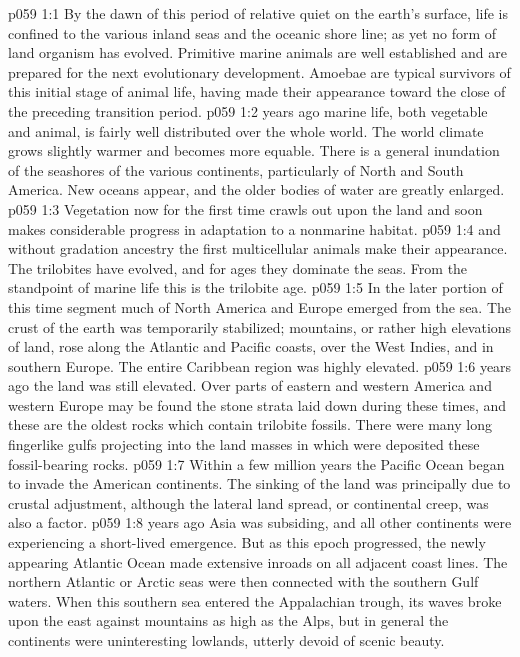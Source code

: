 \vs p059 1:1 By the dawn of this period of relative quiet on the earth’s surface, life is confined to the various inland seas and the oceanic shore line; as yet no form of land organism has evolved. Primitive marine animals are well established and are prepared for the next evolutionary development. Amoebae are typical survivors of this initial stage of animal life, having made their appearance toward the close of the preceding transition period.
\vs p059 1:2 \pc {} years ago marine life, both vegetable and animal, is fairly well distributed over the whole world. The world climate grows slightly warmer and becomes more equable. There is a general inundation of the seashores of the various continents, particularly of North and South America. New oceans appear, and the older bodies of water are greatly enlarged.
\vs p059 1:3 Vegetation now for the first time crawls out upon the land and soon makes considerable progress in adaptation to a nonmarine habitat.
\vs p059 1:4  and without gradation ancestry the first multicellular animals make their appearance. The trilobites have evolved, and for ages they dominate the seas. From the standpoint of marine life this is the trilobite age.
\vs p059 1:5 In the later portion of this time segment much of North America and Europe emerged from the sea. The crust of the earth was temporarily stabilized; mountains, or rather high elevations of land, rose along the Atlantic and Pacific coasts, over the West Indies, and in southern Europe. The entire Caribbean region was highly elevated.
\vs p059 1:6 \pc {} years ago the land was still elevated. Over parts of eastern and western America and western Europe may be found the stone strata laid down during these times, and these are the oldest rocks which contain trilobite fossils. There were many long fingerlike gulfs projecting into the land masses in which were deposited these fossil\hyp{}bearing rocks.
\vs p059 1:7 Within a few million years the Pacific Ocean began to invade the American continents. The sinking of the land was principally due to crustal adjustment, although the lateral land spread, or continental creep, was also a factor.
\vs p059 1:8 \pc {} years ago Asia was subsiding, and all other continents were experiencing a short\hyp{}lived emergence. But as this epoch progressed, the newly appearing Atlantic Ocean made extensive inroads on all adjacent coast lines. The northern Atlantic or Arctic seas were then connected with the southern Gulf waters. When this southern sea entered the Appalachian trough, its waves broke upon the east against mountains as high as the Alps, but in general the continents were uninteresting lowlands, utterly devoid of scenic beauty.
